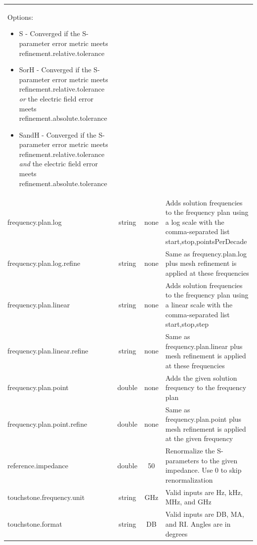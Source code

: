 \documentclass[titlepage]{article}
\renewcommand\_{\textunderscore\linebreak[1]}
\begin{document}
\begin{longtable}[c]{|lccp{8cm}|}
                                                      Options:
                                                      \begin{itemize}[nosep]
                                                         \item S    - Converged if the S-parameter error metric meets refinement.relative.tolerance
                                                         \item SorH - Converged if the S-parameter error metric meets refinement.relative.tolerance \textit{or} the electric field error meets refinement.absolute.tolerance
                                                         \item SandH - Converged if the S-parameter error metric meets refinement.relative.tolerance \textit{and} the electric field error meets refinement.absolute.tolerance
                                                      \end{itemize} \\ 
    frequency.plan.log            & string & none   & Adds solution frequencies to the frequency plan using a log scale with the comma-separated list start,stop,pointsPerDecade \\
    frequency.plan.log.refine     & string & none   & Same as frequency.plan.log plus mesh refinement is applied at these frequencies \\
    frequency.plan.linear         & string & none   & Adds solution frequencies to the frequency plan using a linear scale with the comma-separated list start,stop,step \\
    frequency.plan.linear.refine  & string & none   & Same as frequency.plan.linear plus mesh refinement is applied at these frequencies \\
    frequency.plan.point          & double & none   & Adds the given solution frequency to the frequency plan \\
    frequency.plan.point.refine   & double & none   & Same as frequency.plan.point plus mesh refinement is applied at the given frequency \\
    reference.impedance           & double & 50     & Renormalize the S-parameters to the given impedance. Use 0 to skip renormalization \\
    touchstone.frequency.unit     & string & GHz    & Valid inputs are Hz, kHz, MHz, and GHz \\
    touchstone.format             & string & DB     & Valid inputs are DB, MA, and RI. Angles are in degrees \\

\end{longtable}
\end{document}
